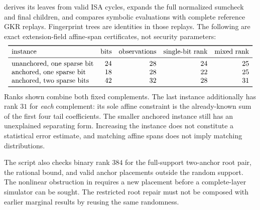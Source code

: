 \documentclass[11pt]{article}
\begin{document}
 derives its leaves from valid ISA cycles, expands the full normalized sumcheck and final children, and compares symbolic evaluations with complete reference GKR replays. Fingerprint trees are identities in those replays. The following are exact extension-field affine-span certificates, not security parameters:
\[
\begin{array}{lrrrr}
\toprule
\text{instance}&\text{bits}&\text{observations}&\text{single-bit rank}&\text{mixed rank}\\
\midrule
\text{unanchored, one sparse bit}&24&28&24&25\\
\text{anchored, one sparse bit}&18&28&22&25\\
\text{anchored, two sparse bits}&42&32&28&31\\
\bottomrule
\end{array}
\]
Ranks shown combine both fixed complements. The last instance additionally has rank $31$ for \emph{each} complement: its sole affine constraint is the already-known sum of the first four tail coefficients. The smaller anchored instance still has an unexplained separating form. Increasing the instance does not constitute a statistical error estimate, and matching affine spans does not imply matching distributions.

The script also checks binary rank $384$ for the full-support two-anchor root pair, the rational bound, and valid anchor placements outside the random support. The nonlinear obstruction in  requires a new placement before a complete-layer simulator can be sought. The restricted root repair must not be composed with earlier marginal results by reusing the same randomness.
\end{document}
